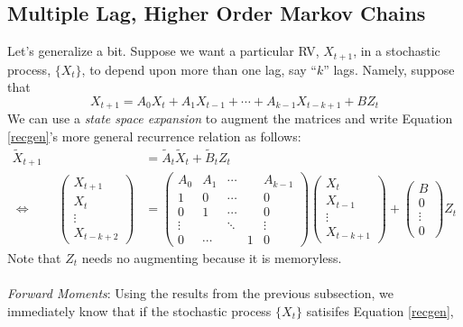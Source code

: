 \documentclass[a4paper,12pt]{scrartcl}
\begin{document}
\newpage
\subsection{Multiple Lag, Higher Order Markov Chains}

Let's generalize a bit.  Suppose we want a particular RV,
${X}_{t+1}$, in a stochastic process, $\{{X}_t\}$, to
depend upon more than one lag, say ``$k$'' lags. Namely, suppose that
\begin{equation}
    \label{recgen}
    {X}_{t+1} = A_0 {X}_t + A_1 {X}_{t-1}
    + \cdots + A_{k-1}{X}_{t-k+1} + B {Z}_t
\end{equation}
We can use a \emph{state space expansion} to augment the matrices 
and write Equation \ref{recgen}'s more general recurrence relation 
as follows:
\begin{align*}
    \tilde{{X}}_{t+1} &= \tilde{A}_t
	\tilde{{X}}_t + \tilde{B}_t {Z}_t \\
    \Leftrightarrow \qquad
    \begin{pmatrix} {X}_{t+1} \\
	{X}_{t} \\ \vdots \\ {X}_{t-k+2} \end{pmatrix}
	&= 
	\begin{pmatrix} A_0 & A_1 & \cdots & & A_{k-1} \\
			1 & 0 & \cdots & & 0 \\
			0 & 1 & \cdots & & 0 \\
			\vdots & & \ddots & & \vdots \\
			0 & \cdots & & 1 & 0 
	\end{pmatrix} 
	\begin{pmatrix} {X}_{t} \\
	{X}_{t-1} \\ \vdots \\ {X}_{t-k+1} \end{pmatrix}
	+ \begin{pmatrix} B \\ 0 \\ \vdots \\ 0 \end{pmatrix}
	{Z}_t
\end{align*}
Note that ${Z}_t$ needs no augmenting because it is memoryless.
\\
\\
{\sl Forward Moments}: Using the results from the previous 
subsection, we immediately know that if the stochastic process
$\{{X}_t\}$ satisifes Equation \ref{recgen},
\end{document}
